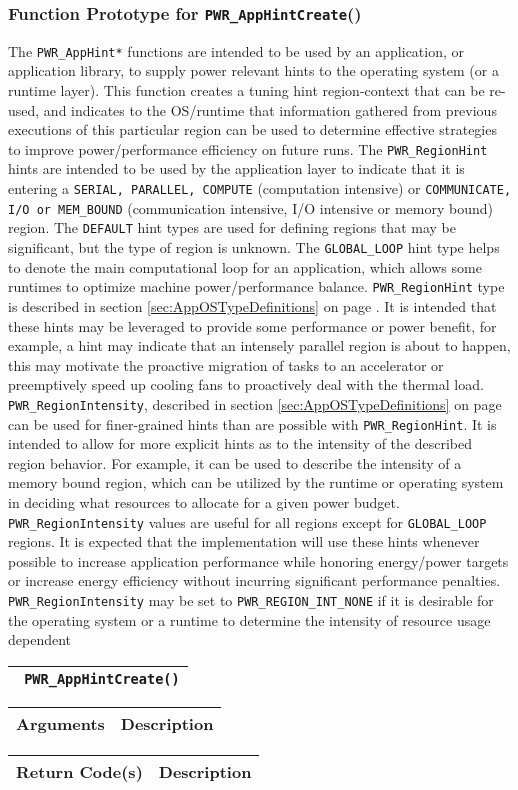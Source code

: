 \documentclass[12pt]{report} %
\makeatletter
\def\PWR#1{\texttt{PWR\_{#1}}}%
\def\null{} %
\def\undecoratedname{}                                  %
\def\longdesc{}                                         %
\def\returns{}                                          %
\def\params{}                                           %
\def\retvals{}                                          %
\def\signatureparams{}                                  %
\def\parameternote{}					%
\newenvironment{prototype}[1]{ %
        \def\undecoratedname{#1} %
}{ %
        \subsubsection{Function Prototype for \PWR{\undecoratedname}()}\label{func:\undecoratedname} %
	\index{\undecoratedname@\PWR{\undecoratedname} \textit{(function)}} %
	\longdesc %
        \vspace{0.1in} %
	\begin{center} %
		\begin{tabular}{| p{13.2cm} |} %
			\hline %
			\noindent\small{\texttt{\returns\ \PWR{\undecoratedname}(\signatureparams)}}\\ %
			\hline %
		\end{tabular} %
	\end{center} %
	\ifx \params\null %
	\else %
		\begin{center} %
			\begin{tabular}{ | p{0.9cm} p{4.8cm} | p{6.7cm} |} %
				\hline %
				\multicolumn{2}{|l|}{\textbf{Arguments}} & \textbf{Description}\marginnote{\scriptsize\parameternote}\\ %
				\hline %
				\params%
				\hline %
			\end{tabular} %
		\end{center} %
	\fi	 %
	\ifx \retvals\null %
	\else %
		\begin{center} %
			\begin{tabular}{ | p{6.1cm} | p{6.8cm} |} %
				\hline %
				\textbf{Return Code(s)} & \textbf{Description} \\ %
				\hline %
				\retvals%
				\hline %
			\end{tabular} %
		\end{center} %
	\fi %
}
\def\longdescription#1{ %
        \def\longdesc{#1} %
}
\providecommand{\DIFaddbegin}{} %
\newcommand{\DIFaddincludegraphics}[2][]{{\color{blue}\fbox{\DIFOincludegraphics[#1]{#2}}}} %
\DeclareRobustCommand{\DIFaddbegin}{\DIFOaddbegin \let\includegraphics\DIFaddincludegraphics} %
\makeatother
\begin{document}
\DIFaddbegin \begin{prototype}{AppHintCreate}
	\longdescription{
The \texttt{PWR_AppHint*} functions are intended to be used by an application, 
or application library, to supply power relevant hints to the operating system (or a runtime layer). 
This function creates a tuning hint region-context that can be re-used, and indicates to the OS/runtime that
information gathered from previous executions of this particular region can be used to determine effective strategies to improve
power/performance efficiency on future runs.  
The \texttt{PWR_RegionHint} hints are intended to be used by the application layer to indicate that it is 
entering a \texttt{SERIAL, PARALLEL, COMPUTE} (computation intensive) or \texttt{COMMUNICATE, I/O or MEM_BOUND}
(communication intensive, I/O intensive or memory bound) region. The
\texttt{DEFAULT} hint types are used for defining regions that may be significant, but the type of region is unknown.
The \texttt{GLOBAL_LOOP} hint type helps to denote the main computational loop for an application, which allows some
runtimes to optimize machine power/performance balance.
\texttt{PWR_RegionHint} type is described in section \ref{sec:AppOSTypeDefinitions} on page \pageref{type:RegionHint}.
It is intended that these hints may be leveraged to provide some performance or power benefit, for example, a 
hint may indicate that an intensely parallel region is about to happen, this may motivate the proactive migration
of tasks to an accelerator or preemptively speed up cooling fans to proactively deal with the thermal load.
\texttt{PWR_RegionIntensity}, described in section \ref{sec:AppOSTypeDefinitions} on page 
\pageref{type:RegionIntensity} can be used for finer-grained hints than are possible with \texttt{PWR_RegionHint}.
It is intended to allow for more explicit hints as to the intensity of the described region behavior. For example, 
it can be used to describe the intensity of a memory bound region, which can be utilized by the runtime or 
operating system in deciding what resources to allocate for a given power budget. \texttt{PWR_RegionIntensity} values
are useful for all regions except for \texttt{GLOBAL_LOOP} regions.
 It is expected that the implementation will use these hints whenever possible to increase application performance 
while honoring energy/power targets or increase energy efficiency without incurring significant performance penalties.
 \texttt{PWR_RegionIntensity} may be set to \texttt{PWR_REGION_INT_NONE} 
if it is desirable for the operating system or a runtime to determine the intensity of resource usage dependent
}
\end{prototype}
\end{document}
